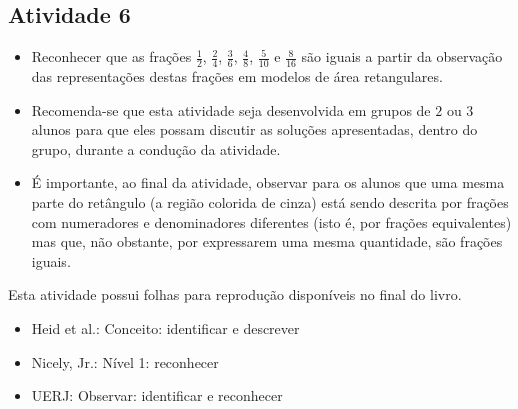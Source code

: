 \begin{multicols}{2}
\subsection{Atividade 6}

\begin{itemize} %
    \item       Reconhecer que as frações       $\frac{1}{2}$,
$\frac{2}{4}$,       $\frac{3}{6}$,       $\frac{4}{8}$,       $\frac{5}{10}$
   e       $\frac{8}{16}$       são iguais a partir da observação das
representações destas frações em modelos de área retangulares.
\end{itemize} %



\begin{itemize} %
    \item       Recomenda-se que esta atividade seja desenvolvida em grupos de
    $2$       ou       $3$       alunos para que eles possam discutir as
soluções apresentadas, dentro do grupo, durante a condução da atividade.
    \item       É importante, ao final da atividade, observar para os alunos que
uma mesma parte do retângulo (a região colorida de cinza) está sendo descrita
por frações com numeradores e denominadores diferentes (isto é, por frações
equivalentes) mas que, não obstante, por expressarem uma mesma quantidade, são
frações iguais.
\end{itemize} %


  Esta atividade possui     folhas para reprodução disponíveis no final do
livro.

   \vspace{.1cm}

 \vspace{.1cm}

\begin{itemize} %
    \item       Heid et al.: Conceito: identificar e descrever
    \item       Nicely, Jr.: Nível 1: reconhecer
    \item       UERJ: Observar: identificar e reconhecer
\end{itemize} %


 \vspace*{\fill}
\columnbreak


\end{multicols}
